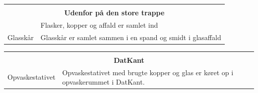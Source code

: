 \documentclass[a4paper,10pt,oneside,article]{memoir}
\begin{document}
\vspace{0.5cm}
\noindent
\begin{tabular}{|l|l|}
    \hline
    \multicolumn{2}{|c|}{} \\
    \multicolumn{2}{|c|}{\Large \textbf{Udenfor på den store trappe}} \\
    \hline
    \begin{minipage}[t]{0.15\textwidth}
        
    \end{minipage} & 
    \begin{minipage}[t]{0.80\textwidth}
        Flasker, kopper og affald er samlet ind
    \end{minipage} \\
    \hline
    \begin{minipage}[t]{0.15\textwidth}
        Glasskår
    \end{minipage} & 
    \begin{minipage}[t]{0.80\textwidth}
        Glasskår er samlet sammen i en spand og smidt i glasaffald
    \end{minipage} \\
    \hline
\end{tabular}

\vspace{0.5cm}
\noindent
\begin{tabular}{|l|l|}
    \hline
    \multicolumn{2}{|c|}{} \\
    \multicolumn{2}{|c|}{\Large \textbf{DatKant}} \\
    \hline
    \begin{minipage}[t]{0.15\textwidth}
        Opvaskestativet
    \end{minipage} & 
    \begin{minipage}[t]{0.80\textwidth}
        Opvaskestativet med brugte kopper og glas er køret op i 
        opvaskerummet i DatKant.
    \end{minipage} \\
    \hline
\end{tabular}
\end{document}
